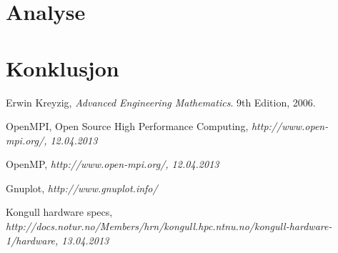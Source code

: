 \documentclass[11pt,norsk,a4paper]{article}
\begin{document}
\section{Analyse}

\section{Konklusjon}




\begin{thebibliography}{99}

Erwin Kreyzig,
\emph{Advanced Engineering Mathematics}.
9th Edition,
2006.

OpenMPI, Open Source High Performance Computing, \it{http://www.open-mpi.org/}, 12.04.2013

OpenMP, \it{http://www.open-mpi.org/}, 12.04.2013

Gnuplot, \it{http://www.gnuplot.info/}

Kongull hardware specs, \it{http://docs.notur.no/Members/hrn/kongull.hpc.ntnu.no/kongull-hardware-1/hardware}, 13.04.2013
\end{thebibliography}
\end{document}
